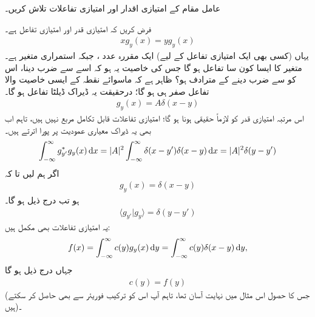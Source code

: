 عامل مقام کے امتیازی اقدار اور امتیازی تفاعلات تلاش کریں۔

\quad
فرض کریں کہ  امتیازی قدر اور  امتیازی تفاعل ہے۔
\begin{align}
xg_{y}(x) = yg_{y}(x) 
\end{align}
یہاں (کسی بھی ایک امتیازی تفاعل کے لیے)  ایک مقررہ عدد ، جبکہ  استمراری متغیر ہے۔متغیر  کا ایسا کون سا تفاعل ہو گا جس کی خاصیت یہ ہو کہ اسے  سے ضرب دینا، اس کو  سے ضرب دینے کے مترادف ہو؟ ظاہر ہے کہ ماسوائے نقطہ  کے ایسی خاصیت والا تفاعل صفر ہی ہو گا؛ درحقیقت یہ ڈیراک ڈیلٹا تفاعل ہو گا۔
\begin{align*}
g_{y}(x) = A\delta(x-y)
\end{align*}
اس مرتبہ امتیازی قدر کو لازماً حقیقی ہونا ہو گا؛ امتیازی تفاعلات قابل تکامل مربع نہیں ہیں، تاہم اب بھی یہ ڈیراک معیاری عمودیت پر پورا اترتے ہیں۔
\begin{align}
\int_{-\infty}^{\infty}g_{y'}^{*}g_{y}(x) \dif x = |A|^{2}\int_{-\infty}^{\infty}\delta(x-y')\delta(x-y) \dif x = |A|^{2} \delta (y-y')
\end{align}
اگر ہم  لیں تا کہ
\begin{align}\label{مساوات_قواعد_ڈیراک_استعمال}
g_{y}(x) = \delta (x-y)
\end{align}
ہو تب درج ذیل ہو گا۔
\begin{align}
\langle g_{y'} | g_{y} \rangle = \delta (y-y')
\end{align}
یہ امتیازی تفاعلات بھی مکمل ہیں:
\begin{align}
f(x) = \int_{-\infty}^{\infty} c(y)g_{y}(x) \dif y = \int_{-\infty}^{\infty} c(y)\delta(x-y)\dif y,
\end{align}
جہاں درج ذیل ہو گا
\begin{align}
c(y) = f(y)
\end{align}
(جس کا حصول اس مثال میں نہایت آسان تھا، تاہم آپ اس کو ترکیب فوریئر سے بھی حاصل کر سکتے ہیں)۔

